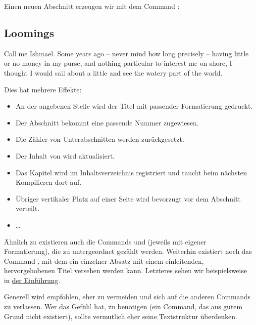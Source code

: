 Einen neuen Abschnitt erzeugen wir mit dem Command :
\begin{latexlisting}
	\section{Loomings}
	Call me Ishmael.
	Some years ago -- never mind how long precisely -- having little or no money in my purse, and nothing particular to interest me on shore, I thought I would sail about a little and see the watery part of the world.
\end{latexlisting}
Dies hat mehrere Effekte:
\begin{itemize}
	\item An der angebenen Stelle wird der Titel mit passender Formatierung gedruckt.
	\item Der Abschnitt bekommt eine passende Nummer zugewiesen.
	\item Die Zähler von Unterabschnitten werden zurückgesetzt.
	\item Der Inhalt von  wird aktualisiert.
	\item Das Kapitel wird im Inhaltsverzeichnis registriert und taucht beim nächsten Kompilieren dort auf.
	\item Übriger vertikaler Platz auf einer Seite wird bevorzugt vor dem Abschnitt verteilt.
	\item \dots
\end{itemize}
Ähnlich zu  existieren auch die Commands  und  (jeweils mit eigener Formatierung), die zu  untergeordnet gezählt werden.
Weiterhin existiert noch das Command , mit dem ein einzelner Absatz mit einem einleitenden, hervorgehobenen Titel versehen werden kann.
Letzteres sehen wir beispielsweise in \hyperref[sec:introduction]{der Einführung}.

Generell wird empfohlen,  eher zu vermeiden und sich auf die anderen Commands zu verlassen.
Wer das Gefühl hat,  zu benötigen (ein Command, das aus gutem Grund nicht existiert), sollte vermutlich eher seine Textstruktur überdenken.

